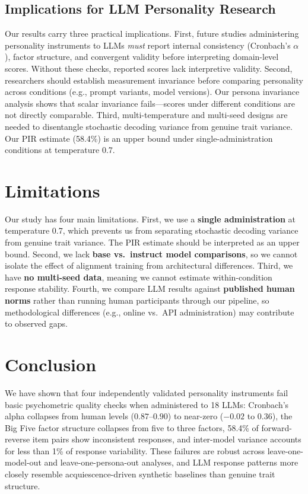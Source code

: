 \documentclass[11pt]{article}
\begin{document}
\subsection{Implications for LLM Personality Research}

Our results carry three practical implications. First, future studies administering personality instruments to LLMs \emph{must} report internal consistency (Cronbach's $\alpha$), factor structure, and convergent validity before interpreting domain-level scores. Without these checks, reported scores lack interpretive validity. Second, researchers should establish measurement invariance before comparing personality across conditions (e.g., prompt variants, model versions). Our persona invariance analysis shows that scalar invariance fails---scores under different conditions are not directly comparable. Third, multi-temperature and multi-seed designs are needed to disentangle stochastic decoding variance from genuine trait variance. Our PIR estimate (58.4\%) is an upper bound under single-administration conditions at temperature 0.7.

\section{Limitations}

Our study has four main limitations. First, we use a \textbf{single administration} at temperature 0.7, which prevents us from separating stochastic decoding variance from genuine trait variance. The PIR estimate should be interpreted as an upper bound. Second, we lack \textbf{base vs.\ instruct model comparisons}, so we cannot isolate the effect of alignment training from architectural differences. Third, we have \textbf{no multi-seed data}, meaning we cannot estimate within-condition response stability. Fourth, we compare LLM results against \textbf{published human norms} rather than running human participants through our pipeline, so methodological differences (e.g., online vs.\ API administration) may contribute to observed gaps.

\section{Conclusion}

We have shown that four independently validated personality instruments fail basic psychometric quality checks when administered to 18 LLMs: Cronbach's alpha collapses from human levels ($0.87$--$0.90$) to near-zero ($-0.02$ to $0.36$), the Big Five factor structure collapses from five to three factors, 58.4\% of forward-reverse item pairs show inconsistent responses, and inter-model variance accounts for less than 1\% of response variability. These failures are robust across leave-one-model-out and leave-one-persona-out analyses, and LLM response patterns more closely resemble acquiescence-driven synthetic baselines than genuine trait structure.
\end{document}
